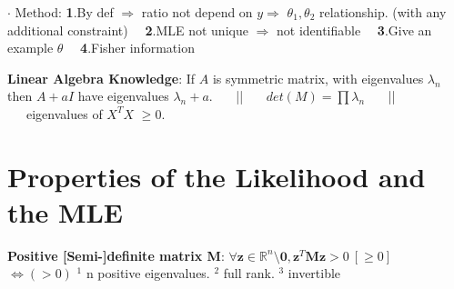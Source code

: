 \documentclass[9pt]{article}
\begin{document}
\vspace{-5pt}
$\cdot$ {\scriptsize Method: \textbf{1}.By def $\Rightarrow$ ratio not depend on $y\Rightarrow$ $\theta_1,\theta_2$ relationship. (with any additional constraint) \ \ \textbf{2}.MLE not unique $\Rightarrow$ not identifiable \ \ \textbf{3}.Give an example $\theta$ \ \ \textbf{4}.Fisher information}

\textbf{Linear Algebra Knowledge}: {\scriptsize If $A$ is symmetric matrix, with eigenvalues $\lambda_n$ then $A+aI$ have eigenvalues $\lambda_n+a$. \ \ \ || \ \ \ $det(M)=\prod\lambda_n$ \ \ \ || \ \ \ eigenvalues of $X^TX$ $\geq0$.}


\section{Properties of the Likelihood and the MLE} %

\textbf{Positive [Semi-]definite matrix M}: $\forall\mathbf{z}\in\mathbb{R}^n\setminus\mathbf{0},\mathbf{z}^T\mathbf{M}\mathbf{z}>0 \ [\geq0]$ \ \ \ \ \ \ $\Leftrightarrow (>0)$ $^1$ n positive eigenvalues. $^2$ full rank. $^3$ invertible
\end{document}
